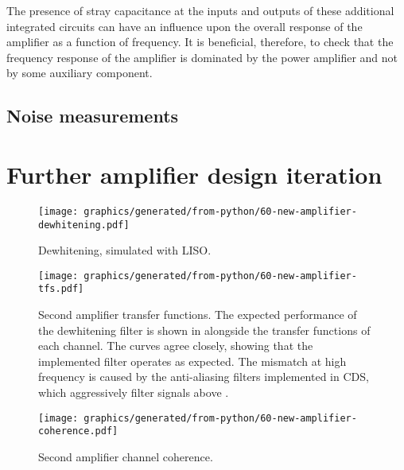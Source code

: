 The presence of stray capacitance at the inputs and outputs of these additional integrated circuits can have an influence upon the overall response of the amplifier as a function of frequency. It is beneficial, therefore, to check that the frequency response of the amplifier is dominated by the power amplifier and not by some auxiliary component.

\subsection{Noise measurements}


\section{\label{sec:hv-amplifier-alt}Further amplifier design iteration}



\begin{figure}
  \centering
  \texttt{[image: graphics/generated/from-python/60-new-amplifier-dewhitening.pdf]}
  \caption{Dewhitening, simulated with LISO.}
  \label{fig:new-amplifier-dewhitening}
\end{figure}

\begin{figure}
  \centering
  \texttt{[image: graphics/generated/from-python/60-new-amplifier-tfs.pdf]}
  \caption{Second amplifier transfer functions. The expected performance of the dewhitening filter is shown in  alongside the transfer functions of each channel. The curves agree closely, showing that the implemented filter operates as expected. The mismatch at high frequency is caused by the anti-aliasing filters implemented in CDS, which aggressively filter signals above .}
  \label{fig:new-amplifier-tfs}
\end{figure}

\begin{figure}
  \centering
  \texttt{[image: graphics/generated/from-python/60-new-amplifier-coherence.pdf]}
  \caption{Second amplifier channel coherence.}
  \label{fig:new-amplifier-coherence}
\end{figure}

